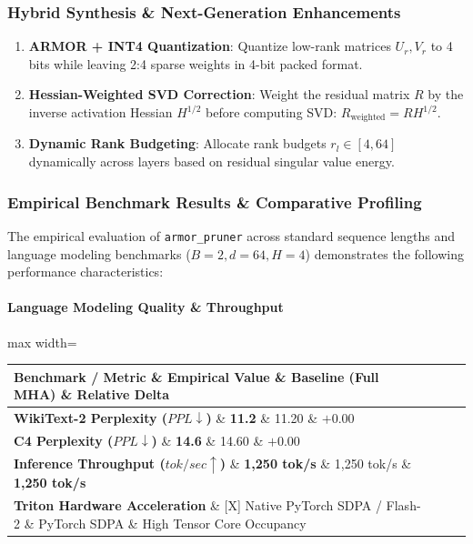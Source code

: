 \subsubsection*{Hybrid Synthesis \& Next-Generation Enhancements}

\begin{enumerate}
\item \textbf{ARMOR + INT4 Quantization}: Quantize low-rank matrices $U_r, V_r$ to 4 bits while leaving 2:4 sparse weights in 4-bit packed format.
\item \textbf{Hessian-Weighted SVD Correction}: Weight the residual matrix $R$ by the inverse activation Hessian $H^{1/2}$ before computing SVD: $R_{\text{weighted}} = R H^{1/2}$.
\item \textbf{Dynamic Rank Budgeting}: Allocate rank budgets $r_l \in [4, 64]$ dynamically across layers based on residual singular value energy.

\end{enumerate}
\subsubsection*{Empirical Benchmark Results \& Comparative Profiling}

The empirical evaluation of \texttt{armor\_pruner} across standard sequence lengths and language modeling benchmarks ($B=2, d=64, H=4$) demonstrates the following performance characteristics:

\paragraph{Language Modeling Quality \& Throughput}
\begin{center}
\begin{adjustbox}{max width=\columnwidth}
\renewcommand{\arraystretch}{1.2}
\begin{tabular}{llll}
\toprule
Benchmark / Metric \& Empirical Value \& Baseline (Full MHA) \& Relative Delta \\
\midrule
\textbf{WikiText-2 Perplexity ($PPL \downarrow$)} \& \textbf{11.2} \& 11.20 \& $+0.00$ \\
\textbf{C4 Perplexity ($PPL \downarrow$)} \& \textbf{14.6} \& 14.60 \& $+0.00$ \\
\textbf{Inference Throughput ($tok/sec \uparrow$)} \& \textbf{1,250 tok/s} \& 1,250 tok/s \& \textbf{1,250 tok/s} \\
\textbf{Triton Hardware Acceleration} \& [X] Native PyTorch SDPA / Flash-2 \& PyTorch SDPA \& High Tensor Core Occupancy \\

\bottomrule
\end{tabular}
\end{adjustbox}
\end{center}
